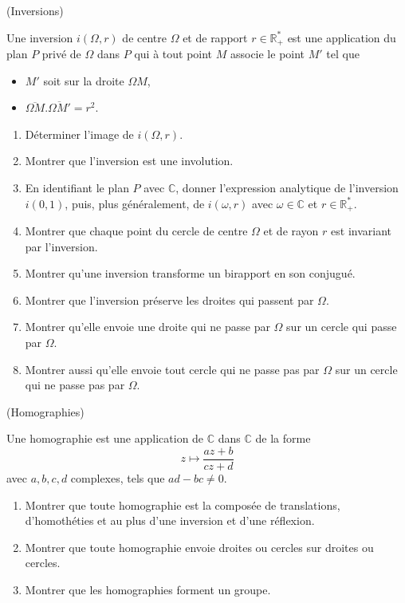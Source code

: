 \documentclass[a4paper,12pt,reqno]{amsart}
\begin{document}
\begin{exo} (Inversions)

  Une inversion $i(\Omega,r)$ de centre $\Omega$ et de rapport $r \in \mathbb{R}^{*}_{+}$ est une application du plan $P$ privé de $\Omega$ dans $P$ qui à tout point $M$ associe le point $M'$ tel que
  \begin{itemize}
    \item $M'$ soit sur la droite $\Omega M$,
    \item $\overline{\Omega M}.\overline{\Omega M'}=r^2$.
  \end{itemize}
  \begin{enumerate}
    \item Déterminer l'image de $i(\Omega,r)$.
    \item Montrer que l'inversion est une involution.
    \item En identifiant le plan $P$ avec $\mathbb{C}$, donner l'expression analytique de l'inversion $i(0,1)$, puis, plus généralement, de $i(\omega,r)$ avec $\omega \in \mathbb{C}$ et $r \in \mathbb{R}^{*}_{+}$.
    \item  Montrer que chaque point du cercle de centre $\Omega$ et de rayon $r$ est invariant par l'inversion.
    \item Montrer qu'une inversion transforme un birapport en son conjugué.
    \item Montrer que l'inversion préserve les droites qui passent par $\Omega$.
    \item Montrer qu'elle envoie une droite qui ne passe par $\Omega$ sur un cercle qui passe par $\Omega$.
    \item Montrer aussi qu'elle envoie tout cercle qui ne passe pas par $\Omega$ sur un cercle qui ne passe pas par $\Omega$.
  \end{enumerate}
\end{exo}


\begin{exo} (Homographies)

  Une homographie est une application de $\mathbb{C}$ dans $\mathbb{C}$ de la forme
  $$
    z\mapsto \frac{az+b}{cz+d}
  $$
  avec $a,b,c,d$ complexes, tels que $ad-bc\neq 0$.
  \begin{enumerate}
    \item Montrer que toute homographie est la composée de translations, d'homothéties et au plus d'une inversion et d'une réflexion.
    \item Montrer que toute homographie envoie droites ou cercles sur droites ou cercles.
    \item Montrer que les homographies forment un groupe.
  \end{enumerate}
\end{exo}
\end{document}
